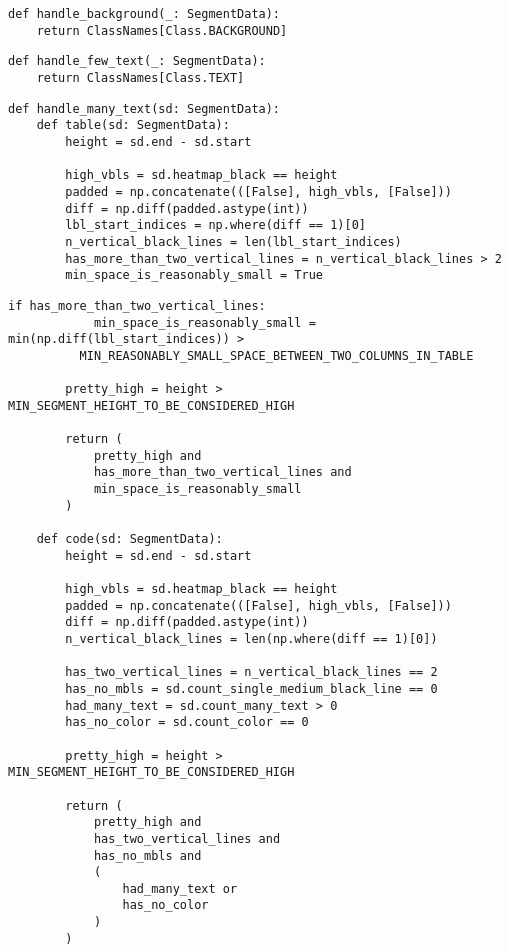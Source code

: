 \begin{lstlisting}[caption={Функция handle\_background}, label={lst:}]
def handle_background(_: SegmentData):
    return ClassNames[Class.BACKGROUND]
\end{lstlisting}

\begin{lstlisting}[caption={Функция handle\_few\_text}, label={lst:}]
def handle_few_text(_: SegmentData):
    return ClassNames[Class.TEXT]
\end{lstlisting}

\begin{lstlisting}[caption={Функция handle\_many\_text (часть 1)}, label={lst:}]
def handle_many_text(sd: SegmentData):
    def table(sd: SegmentData):
        height = sd.end - sd.start

        high_vbls = sd.heatmap_black == height
        padded = np.concatenate(([False], high_vbls, [False]))
        diff = np.diff(padded.astype(int))
        lbl_start_indices = np.where(diff == 1)[0]
        n_vertical_black_lines = len(lbl_start_indices)
        has_more_than_two_vertical_lines = n_vertical_black_lines > 2
        min_space_is_reasonably_small = True
\end{lstlisting}

\newpage

\begin{lstlisting}[caption={Функция handle\_many\_text (часть 2)}, label={lst:}]
        if has_more_than_two_vertical_lines:
            min_space_is_reasonably_small = min(np.diff(lbl_start_indices)) >
          MIN_REASONABLY_SMALL_SPACE_BETWEEN_TWO_COLUMNS_IN_TABLE

        pretty_high = height > MIN_SEGMENT_HEIGHT_TO_BE_CONSIDERED_HIGH

        return (
            pretty_high and
            has_more_than_two_vertical_lines and
            min_space_is_reasonably_small
        )

    def code(sd: SegmentData):
        height = sd.end - sd.start

        high_vbls = sd.heatmap_black == height
        padded = np.concatenate(([False], high_vbls, [False]))
        diff = np.diff(padded.astype(int))
        n_vertical_black_lines = len(np.where(diff == 1)[0])

        has_two_vertical_lines = n_vertical_black_lines == 2
        has_no_mbls = sd.count_single_medium_black_line == 0
        had_many_text = sd.count_many_text > 0
        has_no_color = sd.count_color == 0

        pretty_high = height > MIN_SEGMENT_HEIGHT_TO_BE_CONSIDERED_HIGH

        return (
            pretty_high and
            has_two_vertical_lines and
            has_no_mbls and
            (
                had_many_text or
                has_no_color
            )
        )
\end{lstlisting}

